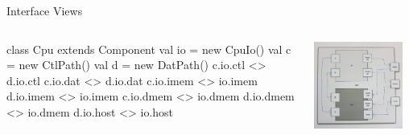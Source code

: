 \documentclass[xcolor=pdflatex,dvipsnames,table]{beamer}
\begin{document}
\begin{frame}[fragile]{Interface Views}
\begin{columns}

\begin{scala}
class Cpu extends Component {
  val io = new CpuIo()
  val c  = new CtlPath()
  val d  = new DatPath()
  c.io.ctl  <> d.io.ctl
  c.io.dat  <> d.io.dat
  c.io.imem <> io.imem
  d.io.imem <> io.imem
  c.io.dmem <> io.dmem
  d.io.dmem <> io.dmem
  d.io.host <> io.host
}
\end{scala}


\begin{center}
\includegraphics[width=0.9\textwidth]{../tutorial/figs/cpu.png} 
\end{center}

\end{columns}
\end{frame}
\end{document}
